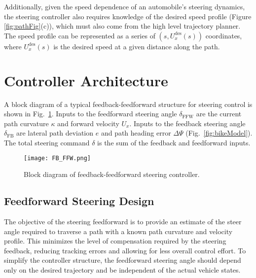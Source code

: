 \newpage
Additionally, given the speed dependence of an automobile's steering dynamics, 
the steering controller also requires knowledge of the desired speed profile (Figure \ref{fig:pathFig}(c)), which must also come from
the high level trajectory planner. The speed profile can be represented as a series of $(s, U_x^\mathrm{des}(s))$ coordinates,
where $U_x^\mathrm{des}(s)$ is the desired speed at a given distance along the path. 
 


 
\section{Controller Architecture}
\label{sec:controllerC2}

A block diagram of a typical feedback-feedforward structure for steering control is shown in Fig.~\ref{fig:controllerBD}. Inputs to the feedforward
steering angle $\delta_\mathrm{FFW}$ are the current path curvature $\kappa$ and forward velocity $U_x$. Inputs to the feedback steering angle $\delta_\mathrm{FB}$ are lateral path deviation
$e$ and path heading error $\Delta\Psi$ (Fig.~\ref{fig:bikeModel}). The total steering command $\delta$ is the sum of the feedback and feedforward inputs.

\begin{figure}[h]
\centering
\texttt{[image: FB\_FFW.png]}
\caption{Block diagram of feedback-feedforward steering controller.}
\label{fig:controllerBD}
\end{figure}

 

\subsection{Feedforward Steering Design}
\label{sec:baselineFFW}

The objective of the steering feedforward is to provide an estimate of the steer angle required to traverse a path with a known path curvature and velocity profile.
This minimizes the level of compensation required by the steering feedback, reducing tracking errors and allowing for less overall control effort. 
To simplify the controller structure, the feedforward steering angle should depend only on the desired trajectory and be independent of the actual vehicle states.

